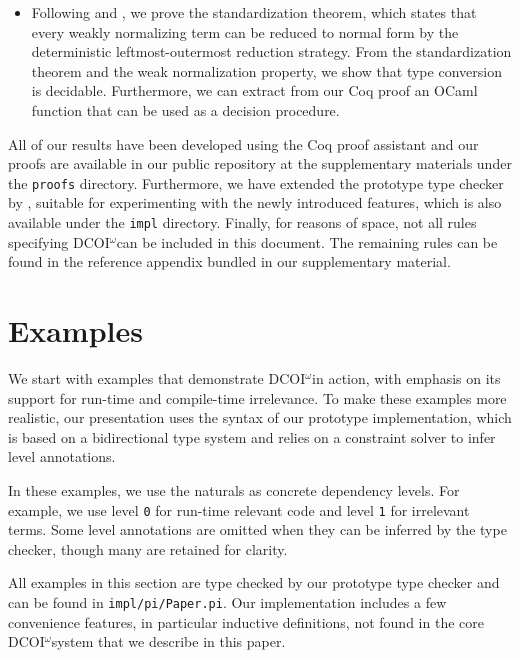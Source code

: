 \documentclass[acmsmall, screen=true, nonacm=true,
  review=\ifpublic false\else true\fi,
  anonymous=\ifanonymous true\else false\fi
]{acmart}
\makeatletter
\newcommand{\sw}[1]{}
\newcommand{\jc}[1]{}
\newcommand{\name}{\texorpdfstring{DCOI$^{\omega}$\@\xspace}{DCOI-omega}}
\newcommand{\repo}{%
  \ifpublic our public repository at \jc{TODO: replace with repo URL}%
  \else the supplementary materials%
  \fi
}
\makeatother
\begin{document}
\begin{itemize}[leftmargin=\parindent]
\item Following \citet{takahashi:par} and
  \citet{accattoli:factorization}, we prove the standardization
  theorem, which states that every weakly normalizing term can be
  reduced to normal form by the deterministic leftmost-outermost reduction
  strategy. From the standardization theorem and the weak
  normalization property, we show that type conversion is decidable.
  Furthermore, we can extract from our Coq proof an OCaml function that can 
  be used as a decision procedure.
\end{itemize}

All of our results have been developed using the Coq proof
assistant and our proofs are available in \repo{} under the \texttt{proofs} directory.
Furthermore, we have extended the prototype type checker by
\citet{liu:dcoi},
suitable for experimenting with the newly introduced features,
which is also available under the \texttt{impl} directory.
\ifsubmission
Finally, for reasons of space, not all rules specifying \name can be included 
in this document. The remaining rules can be found in the reference appendix 
bundled in our supplementary material.
\fi

\section{Examples} \label{sec:examples}

We start with examples that demonstrate \name in action, with emphasis on its
support for run-time and compile-time irrelevance.  To make these examples more
realistic, our presentation uses the syntax of our prototype
implementation, which is based on a bidirectional type system and
relies on a constraint solver to infer level annotations.  

In these examples, we use the naturals as concrete dependency levels. For example, 
we use level \texttt{0} for run-time relevant code and level \texttt{1} for irrelevant terms. Some level annotations are omitted when they can be inferred by the type checker, though many are retained for
clarity.

All examples in this section are type checked by our prototype type checker
and can be found in \texttt{impl/pi/Paper.pi}.
Our implementation includes a few convenience features,
in particular inductive definitions,
not found in the core \name system that we describe in this paper.
\sw{Perhaps we
  should replace the False elimination example with \texttt{divides\_to\_Nat}
  from \texttt{impl/pi/Prime.pi}? This only requires natural number induction,
  although it is a lot more complicated of an example.}
\sw{I wish we had more space around the code to set it off in this section}
\end{document}
